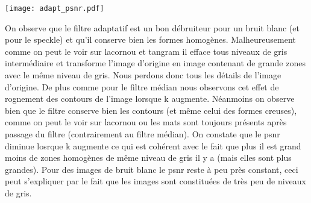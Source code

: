 \documentclass[12pt]{article}
\numberwithin{equation}{section}
\begin{document}
\begin{center}
\texttt{[image: adapt\_psnr.pdf]}\\
\end{center}

On observe que le filtre adaptatif est un bon débruiteur pour un bruit blanc (et pour le speckle) et qu'il conserve bien les formes homogènes. Malheureusement comme on peut le voir sur lacornou et tangram il efface tous niveaux de gris intermédiaire et transforme l'image d'origine en image contenant de grande zones avec le même niveau de gris. Nous perdons donc tous les détails de l'image d'origine. De plus comme pour le filtre médian nous observons cet effet de rognement des contours de l'image lorsque k augmente. Néanmoins on observe bien que le filtre conserve bien les contours (et même celui des formes creuses), comme on peut le voir sur lacornou ou les mats sont toujours présents après passage du filtre (contrairement au filtre médian). On constate que le psnr diminue losrque  k augmente ce qui est cohérent avec le fait que plus il est grand moins de zones homogènes de même niveau de gris il y a (mais elles sont plus grandes). Pour des images de bruit blanc le psnr reste à peu près constant, ceci peut s'expliquer par le fait que les images sont constituées de très peu de niveaux de gris.   
\end{document}
